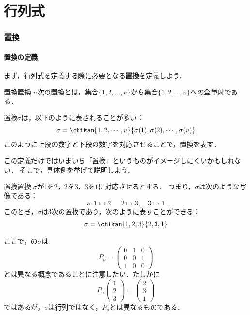 \part{行列式}

\begin{abstract}
  このセクションでは「行列式」に関連する基本的な用語や概念を定義し，それらの関係性を明確にする．
\end{abstract}

\section{置換}

\subsection{置換の定義}

まず，行列式を定義する際に必要となる\textbf{置換}を定義しよう．

\begin{definition}{置換}{置換}
  $n$次の置換とは，集合$\{1, 2, \dots, n\}$から集合$\{1, 2, \dots, n\}$への全単射である．
  
  置換$\sigma$は，以下のように表されることが多い：
  \[
  \sigma = \chikan{1, 2, \cdots, n}{\sigma(1), \sigma(2), \cdots, \sigma(n)}
  \]
  このように上段の数字と下段の数字を対応させることで，置換を表す．
\end{definition}

この定義だけではいまいち「置換」というものがイメージしにくいかもしれない．
そこで，具体例を挙げて説明しよう．

\begin{example}{置換}{置換} 
$\sigma$が$1$を$2$，$2$を$3$，$3$を$1$に対応させるとする．
つまり，$\sigma$は次のような写像である：
\[
\sigma \colon 1 \mapsto 2, \quad 2 \mapsto 3, \quad 3 \mapsto 1
\]
このとき，$\sigma$は$3$次の置換であり，次のように表すことができる：
\[
\sigma = \chikan{1, 2, 3}{2, 3, 1}
\]
\end{example}

ここで，の$\sigma$は
\[
P_\sigma = 
\begin{pmatrix}
  0 & 1 & 0 \\
  0 & 0 & 1\\ 
  1 & 0 & 0 
\end{pmatrix}
\]
とは異なる概念であることに注意したい．たしかに
\[
 P_\sigma \begin{pmatrix} 1 \\ 2 \\ 3 \end{pmatrix} = \begin{pmatrix} 2 \\ 3\\ 1 \end{pmatrix}
\]
ではあるが，$\sigma$は行列ではなく，$P_\sigma$とは異なるものである．

